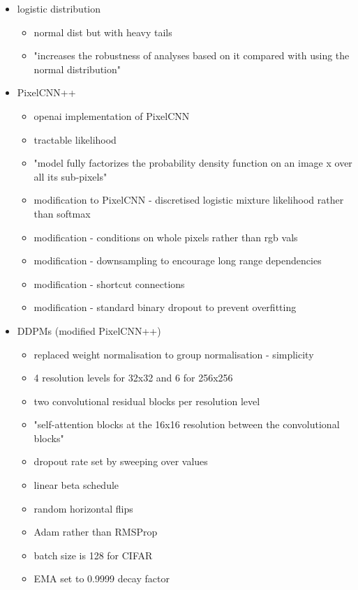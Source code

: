 \documentclass{article}
\begin{document}
\begin{itemize}
    \item logistic distribution
    \begin{itemize}
        \item normal dist but with heavy tails 
        \item "increases the robustness of analyses based on it compared with using the normal distribution"
    \end{itemize}
    \item PixelCNN++
    \begin{itemize}
        \item openai implementation of PixelCNN
        \item tractable likelihood
        \item "model fully factorizes the probability density function on an image x over all its sub-pixels"
        \item modification to PixelCNN - discretised logistic mixture likelihood rather than softmax
        \item modification - conditions on whole pixels rather than rgb vals
        \item modification - downsampling to encourage long range dependencies
        \item modification - shortcut connections
        \item modification - standard binary dropout to prevent overfitting
    \end{itemize}
    \item DDPMs (modified PixelCNN++)
    \begin{itemize}
        \item replaced weight normalisation to group normalisation - simplicity 
        \item 4 resolution levels for 32x32 and 6 for 256x256
        \item two convolutional residual blocks per resolution level
        \item "self-attention blocks at the 16x16 resolution between the convolutional blocks"
        \item dropout rate set by sweeping over values
        \item linear beta schedule
        \item random horizontal flips
        \item Adam rather than RMSProp
        \item batch size is 128 for CIFAR
        \item EMA set to 0.9999 decay factor
    \end{itemize}
\end{itemize}
\end{document}
